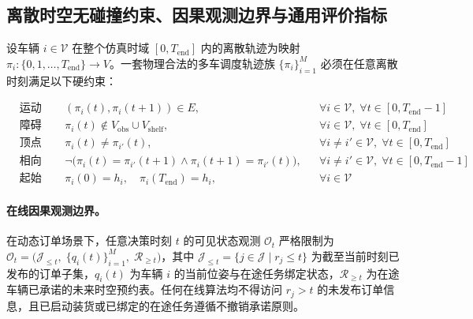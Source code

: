 \subsection{离散时空无碰撞约束、因果观测边界与通用评价指标}

设车辆 $i \in \mathcal{V}$ 在整个仿真时域 $[0, T_{\text{end}}]$ 内的离散轨迹为映射 $\pi_i: \{0, 1, \dots, T_{\text{end}}\} \to V$。一套物理合法的多车调度轨迹族 $\{\pi_i\}_{i=1}^M$ 必须在任意离散时刻满足以下硬约束：

\begin{align}
  &\text{运动连通性：} && (\pi_i(t), \pi_i(t+1)) \in E, && \forall i \in \mathcal{V},\; \forall t \in [0, T_{\text{end}}-1] \label{eq:motion-conn} \\
  &\text{障碍物规避：} && \pi_i(t) \notin V_{\text{obs}} \cup V_{\text{shelf}}, && \forall i \in \mathcal{V},\; \forall t \in [0, T_{\text{end}}] \label{eq:obs-avoid} \\
  &\text{顶点互斥（无碰撞）：} && \pi_i(t) \neq \pi_{i'}(t), && \forall i \neq i' \in \mathcal{V},\; \forall t \in [0, T_{\text{end}}] \label{eq:vertex-mutex} \\
  &\text{相向换边互斥：} && \neg\big(\pi_i(t) = \pi_{i'}(t+1) \wedge \pi_i(t+1) = \pi_{i'}(t)\big), && \forall i \neq i' \in \mathcal{V},\; \forall t \in [0, T_{\text{end}}-1] \label{eq:edge-mutex} \\
  &\text{起始与最终返库：} && \pi_i(0) = h_i,\quad \pi_i(T_{\text{end}}) = h_i, && \forall i \in \mathcal{V} \label{eq:home-return}
\end{align}

\paragraph{在线因果观测边界。} 在动态订单场景下，任意决策时刻 $t$ 的可见状态观测 $\mathcal{O}_t$ 严格限制为 $\mathcal{O}_t = \big(\mathcal{J}_{\le t},\; \{q_i(t)\}_{i=1}^M,\; \mathcal{R}_{\ge t}\big)$，其中 $\mathcal{J}_{\le t} = \{j \in \mathcal{J} \mid r_j \le t\}$ 为截至当前时刻已发布的订单子集，$q_i(t)$ 为车辆 $i$ 的当前位姿与在途任务绑定状态，$\mathcal{R}_{\ge t}$ 为在途车辆已承诺的未来时空预约表。任何在线算法均不得访问 $r_j > t$ 的未发布订单信息，且已启动装货或已绑定的在途任务遵循不撤销承诺原则。

